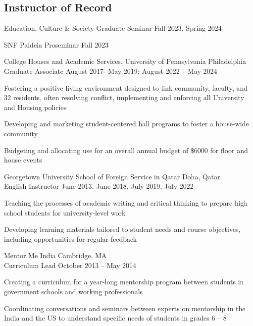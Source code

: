 \documentclass[11pt,letterpaper]{report}
\newcommand{\listitemspace}{0.25em}
\renewenvironment{itemize}{\begin{list}{}{\setlength{\leftmargin}{0em}\setlength{\parskip}{0em}\setlength{\itemsep}{\listitemspace}\setlength{\parsep}{\listitemspace}}}{\end{list}}
\begin{document}
    \subsection*{Instructor of Record}
    \begin{itemize}
        \item Education, Culture \& Society Graduate Seminar Fall 2023, Spring 2024
        \item SNF Paideia Proseminar Fall 2023
    \end{itemize}
    College Houses and Academic Services, University of Pennsylvania Philadelphia\\
    Graduate Associate August 2017- May 2019; August 2022 – May 2024
    \begin{itemize}
        \item Fostering a positive living environment designed to link community, faculty, and 32 residents, often resolving conflict, implementing and enforcing all University and Housing policies
        \item Developing and marketing student-centered hall programs to foster a house-wide community
        \item Budgeting and allocating use for an overall annual budget of \$6000 for floor and house events
    \end{itemize}
    Georgetown University School of Foreign Service in Qatar Doha, Qatar\\
    English Instructor June 2013, June 2018, July 2019, July 2022
    \begin{itemize}
        \item Teaching the processes of academic writing and critical thinking to prepare high school students for university-level work
        \item Developing learning materials tailored to student needs and course objectives, including opportunities for regular feedback
    \end{itemize}
    Mentor Me India Cambridge, MA\\
    Curriculum Lead October 2013 – May 2014
    \begin{itemize}
        \item Creating a curriculum for a year-long mentorship program between students in government schools and working professionals
        \item Coordinating conversations and seminars between experts on mentorship in the India and the US to understand specific needs of students in grades 6 – 8
    \end{itemize}
\end{document}
